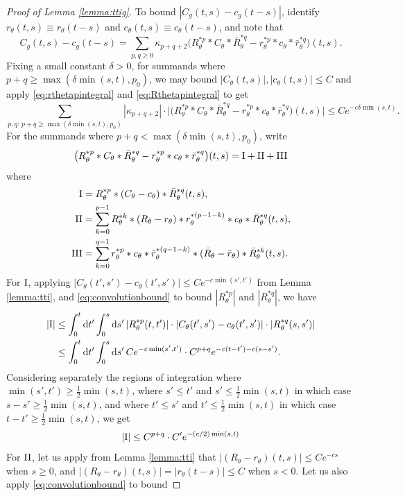 \begin{proof}[Proof of Lemma \ref{lemma:ttig}]
To bound $|C_g(t,s)-c_g(t-s)|$, identify $r_\theta(t,s) \equiv r_\theta(t-s)$
and $c_\theta(t,s) \equiv c_\theta(t-s)$, and note that
\[C_g(t,s)-c_g(t-s)=\sum_{p,q \geq 0}
\kappa_{p+q+2} \big(R_\theta^{*p} * C_\theta * \bar R_\theta^{*q}
-r_\theta^{*p} * c_\theta * \bar r_\theta^{*q}\big)(t,s).\]
Fixing a small constant $\delta>0$, for summands where $p+q \geq
\max(\delta\min(s,t),p_0)$, we may bound $|C_\theta(t,s)|,|c_\theta(t,s)| \leq
C$ and apply \eqref{eq:rthetapintegral} and \eqref{eq:Rthetapintegral} to get
\[\sum_{p,q:\,p+q \geq \max(\delta\min(s,t),p_0)}
|\kappa_{p+q+2}| \cdot \big|\big(R_\theta^{*p} * C_\theta * \bar R_\theta^{*q}
-r_\theta^{*p} * c_\theta * \bar r_\theta^{*q}\big)(t,s)\big|
\leq Ce^{-c\delta\min(s,t)}.\]
For the summands where $p+q<\max(\delta \min(s,t),p_0)$, write
\[\big(R_\theta^{*p} * C_\theta * \bar R_\theta^{*q}
-r_\theta^{*p} * c_\theta * \bar r_\theta^{*q}\big)(t,s)=\mathrm{I}+\mathrm{II}+\mathrm{III}\]
where
\begin{align*}
\mathrm{I}&=R_\theta^{*p}*(C_\theta-c_\theta)*\bar R_\theta^{*q}(t,s),\\
\mathrm{II}&=\sum_{k=0}^{p-1} R_\theta^{*k} * (R_\theta-r_\theta)
*r_\theta^{*(p-1-k)}*c_\theta*\bar R_\theta^{*q}(t,s),\\
\mathrm{III}&=\sum_{k=0}^{q-1} r_\theta^{*p}*c_\theta*\bar r_\theta^{*(q-1-k)}
*(\bar R_\theta-\bar r_\theta)*\bar R_\theta^{*k}(t,s).\\
\end{align*}
For $\mathrm{I}$, applying $|C_\theta(t',s')-c_\theta(t',s')| \leq Ce^{-c\min(s',t')}$
from Lemma \ref{lemma:tti}, and \eqref{eq:convolutionbound} to bound
$|R_\theta^{*p}|$ and $|R_\theta^{*q}|$, we have
\begin{align*}
|\mathrm{I}|& \leq \int_0^t \mathrm{d} t' \int_0^s \mathrm{d} s'\,
|R_\theta^{*p}(t,t')| \cdot |C_\theta(t',s')-c_\theta(t',s')|
\cdot |R_\theta^{*q}(s,s')|\\
&\leq \int_0^t\mathrm{d} t' \int_0^s\mathrm{d} s'
\,Ce^{-c\min(s',t')} \cdot C^{p+q}e^{-c(t-t')-c(s-s')}.
\end{align*}
Considering separately the regions of integration where $\min(s',t') \geq
\frac{1}{2}\min(s,t)$, where
$s' \leq t'$ and $s' \leq \frac{1}{2}\min(s,t)$ in which
case $s-s' \geq \frac{1}{2}\min(s,t)$,
and where $t' \leq s'$ and $t' \leq \frac{1}{2}\min(s,t)$ in which
case $t-t' \geq \frac{1}{2}\min(s,t)$, we get
\[|\mathrm{I}|\leq C^{p+q} \cdot C'e^{-(c/2)\min(s,t)}\]
For $\mathrm{II}$, let us apply from Lemma \ref{lemma:tti} that
$|(R_\theta-r_\theta)(t,s)| \leq Ce^{-cs}$ when $s \geq 0$,
and $|(R_\theta-r_\theta)(t,s)|=|r_\theta(t-s)| \leq C$ when $s<0$.
Let us also apply \eqref{eq:convolutionbound} to bound

\end{proof}
